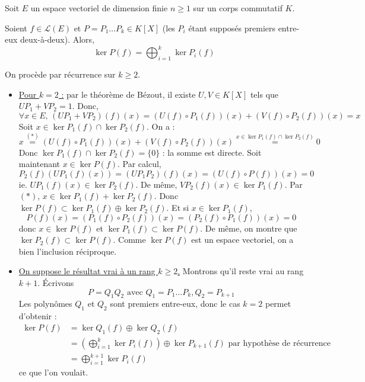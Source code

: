 




	
	Soit $E$ un espace vectoriel de dimension finie $n \geq 1$ sur un corps commutatif $K$.

	\begin{lemma}
		\label{lemme-noyaux-1}
		Soient $f \in \mathcal{L}(E)$ et $P = P_1 \dots P_k \in K[X]$ (les $P_i$ étant supposés premiers entre-eux deux-à-deux). Alors,
		\[ \ker{P(f)} = \bigoplus_{i = 1}^k \ker{P_i(f)} \]
	\end{lemma}

	\begin{demonstration}
		On procède par récurrence sur $k \geq 2$.
		\begin{itemize}
			\item \underline{Pour $k = 2$ :} par le théorème de Bézout, il existe $U, V \in K[X]$ tels que $UP_1 + VP_2 = 1$. Donc,
			\[ \forall x \in E, \, (UP_1 + VP_2)(f)(x) = (U(f) \circ P_1(f))(x) + (V(f) \circ P_2(f))(x) = x \tag{$*$} \]
			Soit $x \in \ker{P_1(f)} \cap \ker{P_2(f)}$. On a :
			\[ x \overset{(*)}{=} (U(f) \circ P_1(f))(x) + (V(f) \circ P_2(f))(x) \overset{x \in \ker{P_1(f)} \cap \ker{P_2(f)}}{=} 0 \]
			Donc $\ker{P_1(f)} \cap \ker{P_2(f)} = \{ 0 \}$ : la somme est directe.
			\newpar
			Soit maintenant $x \in \ker{P(f)}$. Par calcul,
			\[ P_2(f)(UP_1(f)(x)) = (UP_1P_2)(f)(x) = (U(f) \circ P(f))(x) = 0 \]
			ie. $UP_1(f)(x) \in \ker{P_2(f)}$. De même, $VP_2(f)(x) \in \ker{P_1(f)}$. Par $(*)$, $x \in \ker{P_1(f)} + \ker{P_2(f)}$. Donc $\ker{P(f)} \subset \ker{P_1(f)} \oplus \ker{P_2(f)}$.
			\newpar
			Et si $x \in \ker{P_1(f)}$,
			\[ P(f)(x) = (P_1(f) \circ P_2(f))(x) = (P_2(f) \circ P_1(f))(x) = 0 \]
			donc $x \in \ker{P(f)}$ et $\ker{P_1}(f) \subset \ker{P(f)}$. De même, on montre que $\ker{P_2}(f) \subset \ker{P(f)}$. Comme $\ker{P(f)}$ est un espace vectoriel, on a bien l'inclusion réciproque.
			\item \underline{On suppose le résultat vrai à un rang $k \geq 2$.} Montrons qu'il reste vrai au rang $k+1$. Écrivons
			\[ P = Q_1Q_2 \text{ avec } Q_1 = P_1 \dots P_k, Q_2 = P_{k+1} \]
			Les polynômes $Q_1$ et $Q_2$ sont premiers entre-eux, donc le cas $k = 2$ permet d'obtenir :
			\begin{align*}
				\ker{P(f)} &= \ker{Q_1(f)} \oplus \ker{Q_2(f)} \\
				&= \left( \bigoplus_{i = 1}^k \ker{P_i(f)} \right) \oplus \ker{P_{k+1}(f)} \text{ par hypothèse de récurrence} \\
				&= \bigoplus_{i = 1}^{k+1} \ker{P_i(f)}
			\end{align*}
			ce que l'on voulait.
		\end{itemize}
	\end{demonstration}


